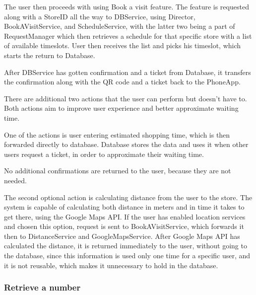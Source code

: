   

The user then proceeds with using Book a visit feature. The feature is requested along with a StoreID all the way to DBService, using Director, BookAVisitService, and ScheduleService, with the latter two being a part of RequestManager which then retrieves a schedule for that specific store with a list of available timeslots. User then receives the list and picks his timeslot, which starts the return to Database.  

  
After DBService has gotten confirmation and a ticket from Database, it transfers the confirmation along with the QR code and a ticket back to the PhoneApp.  
  
There are additional two actions that the user can perform but doesn't have to. Both actions aim to improve user experience and better approximate waiting time.  

  

One of the actions is user entering estimated shopping time, which is then forwarded directly to database. Database stores the data and uses it when other users request a ticket, in order to approximate their waiting time.  

No additional confirmations are returned to the user, because they are not needed.  

  

The second optional action is calculating distance from the user to the store. The system is capable of calculating both distance in meters and in time it takes to get there, using the Google Maps API. If the user has enabled location services and chosen this option, request is sent to BookAVisitService, which forwards it then to DistanceService and GoogleMapsService. After Google Maps API has calculated the distance, it is returned immediately to the user, without going to the database, since this information is used only one time for a specific user, and it is not reusable, which makes it unnecessary to hold in the database.  
\newpage

\subsubsection{Retrieve a number }


